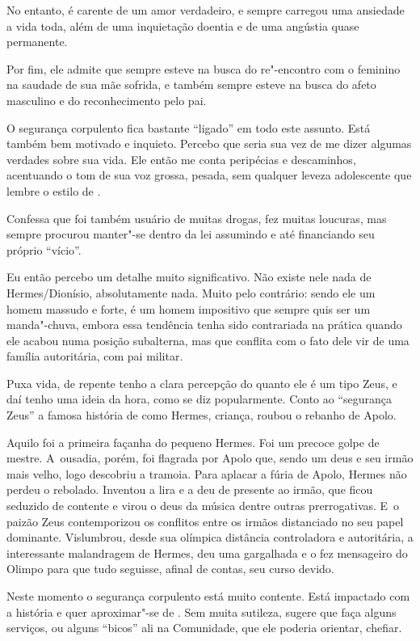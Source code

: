 No entanto,  é carente de um amor verdadeiro, e sempre carregou uma
ansiedade a vida toda, além de uma inquietação doentia e de uma angústia
quase permanente.

Por fim, ele admite que sempre esteve na busca do re"-encontro com o
feminino na saudade de sua mãe sofrida, e também sempre esteve na busca
do afeto masculino e do reconhecimento pelo pai.

\asterisc{}

O segurança corpulento fica bastante ``ligado'' em todo este assunto.
Está também bem motivado e inquieto. Percebo que seria sua vez de me
dizer algumas verdades sobre sua vida. Ele então me conta peripécias e
descaminhos, acentuando o tom de sua voz grossa, pesada, sem qualquer
leveza adolescente que lembre o estilo de .

Confessa que foi também usuário de muitas drogas, fez muitas loucuras,
mas sempre procurou manter"-se dentro da lei assumindo e até financiando
seu próprio ``vício''.

Eu então percebo um detalhe muito significativo. Não existe nele nada de
Hermes/Dionísio, absolutamente nada. Muito pelo contrário: sendo ele um
homem massudo e forte, é um homem impositivo que sempre quis ser um
manda"-chuva, embora essa tendência tenha sido contrariada na prática
quando ele acabou numa posição subalterna, mas que conflita com o fato
dele vir de uma família autoritária, com pai militar.

Puxa vida, de repente tenho a clara percepção do quanto ele é um tipo
Zeus, e daí tenho uma ideia da hora, como se diz popularmente. Conto ao
``segurança Zeus'' a famosa história de como Hermes, criança, roubou o
rebanho de Apolo.

Aquilo foi a primeira façanha do pequeno Hermes. Foi um precoce golpe de
mestre. A~ousadia, porém, foi flagrada por Apolo que, sendo um deus e
seu irmão mais velho, logo descobriu a tramoia. Para aplacar a fúria de
Apolo, Hermes não perdeu o rebolado. Inventou a lira e a deu de presente
ao irmão, que ficou seduzido de contente e virou o deus da música dentre
outras prerrogativas. E~o paizão Zeus contemporizou os conflitos entre
os irmãos distanciado no seu papel dominante. Vislumbrou, desde sua
olímpica distância controladora e autoritária, a interessante
malandragem de Hermes, deu uma gargalhada e o fez mensageiro do Olimpo
para que tudo seguisse, afinal de contas, seu curso devido.

Neste momento o segurança corpulento está muito contente. Está impactado
com a história e quer aproximar"-se de . Sem muita sutileza, sugere que
 faça alguns serviços, ou alguns ``bicos'' ali na Comunidade, que ele
poderia orientar, chefiar.

